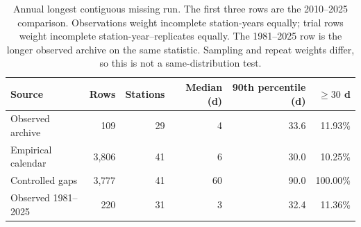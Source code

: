 \begin{table}[t]\centering\small
\caption{Annual longest contiguous missing run. The first three rows are the 2010--2025 comparison. Observations weight incomplete station-years equally; trial rows weight incomplete station-year--replicates equally. The 1981--2025 row is the longer observed archive on the same statistic. Sampling and repeat weights differ, so this is not a same-distribution test.}
\label{tab:observed-gaps}
\begin{tabular}{lrrrrr}\toprule Source & Rows & Stations & Median (d) & 90th percentile (d) & $\geq30$ d \\\midrule
Observed archive & 109 & 29 & 4 & 33.6 & 11.93\% \\
Empirical calendar & 3,806 & 41 & 6 & 30.0 & 10.25\% \\
Controlled gaps & 3,777 & 41 & 60 & 90.0 & 100.00\% \\
Observed 1981--2025 & 220 & 31 & 3 & 32.4 & 11.36\% \\
\bottomrule\end{tabular}\end{table}
